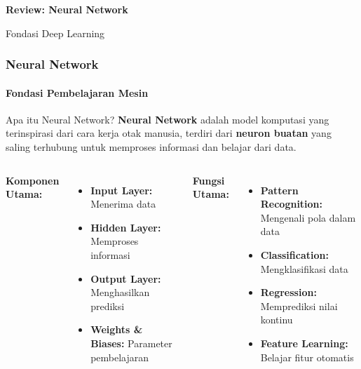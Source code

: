 \documentclass[t,aspectratio=169,xcolor=dvipsnames]{beamer}
\begin{document}
\begin{frame}[plain]
    \begin{center}
        \vspace{3cm}
        {\Huge \textbf{Review: Neural Network}}
        \vspace{0.5cm}
        
        {\large Fondasi Deep Learning}
    \end{center}
\end{frame}

\begin{frame}
    \frametitle{Neural Network}
    \framesubtitle{Fondasi Pembelajaran Mesin}
    \small
    \begin{block}{Apa itu Neural Network?}
        \textbf{Neural Network} adalah model komputasi yang terinspirasi dari cara kerja otak manusia, terdiri dari \textbf{neuron buatan} yang saling terhubung untuk memproses informasi dan belajar dari data.
    \end{block}

    \begin{columns}[t]
        \textbf{Komponen Utama:}
        \begin{itemize}
            \item \textbf{Input Layer:} Menerima data
            \item \textbf{Hidden Layer:} Memproses informasi
            \item \textbf{Output Layer:} Menghasilkan prediksi
            \item \textbf{Weights \& Biases:} Parameter pembelajaran
        \end{itemize}

        \textbf{Fungsi Utama:}
        \begin{itemize}
            \item \textbf{Pattern Recognition:} Mengenali pola dalam data
            \item \textbf{Classification:} Mengklasifikasi data
            \item \textbf{Regression:} Memprediksi nilai kontinu
            \item \textbf{Feature Learning:} Belajar fitur otomatis
        \end{itemize}
    \end{columns}

\end{frame}
\end{document}
